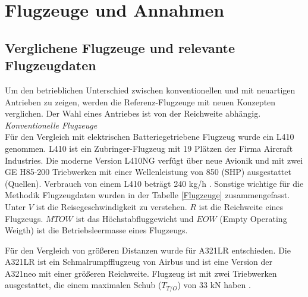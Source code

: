 \section{Flugzeuge und Annahmen}
\subsection{Verglichene Flugzeuge und relevante Flugzeugdaten}
\label{ss:Relevante Flugzeugdaten}
%
Um den betrieblichen Unterschied zwischen konventionellen und mit neuartigen Antrieben zu zeigen, werden die Referenz-Flugzeuge mit neuen 
Konzepten verglichen. 
Der Wahl eines Antriebes ist von der Reichweite abhängig.\\
\textit{Konventionelle Flugzeuge}\\
Für den Vergleich mit elektrischen Batteriegetriebene Flugzeug wurde ein L410 genommen. 
L410 ist ein Zubringer-Flugzeug mit 19 Plätzen der Firma Aircraft Industries. 
Die moderne Version L410NG verfügt über neue Avionik und mit zwei GE H85-200 Triebwerken mit einer Wellenleistung von 850 (SHP) ausgestattet (Quellen).
Verbrauch von einem L410 beträgt 240 kg/h \cite{let2016l410}. Sonstige wichtige für die Methodik Flugzeugdaten wurden in der Tabelle \ref{Flugzeuge} zusammengefasst.
Unter $V$ ist die Reisegeschwindigkeit zu verstehen. $R$ ist die Reichweite eines Flugzeugs. $MTOW$ ist das Höchstabfluggewicht 
und $EOW$ (Empty Operating Weigth) ist die Betriebsleermasse eines Flugzeugs.

Für den Vergleich von größeren Distanzen wurde für A321LR entschieden. 
Die A321LR ist ein Schmalrumpfflugzeug von Airbus und ist eine Version der A321neo mit einer größeren Reichweite.
Flugzeug ist mit zwei Triebwerken ausgestattet, die einem maximalen Schub ($T_{T/O}$) von 33 kN haben \cite{eurocontrol_a321}.

